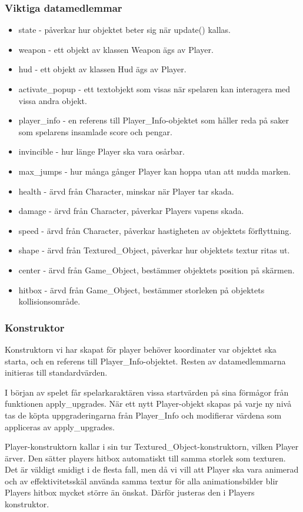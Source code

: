 \documentclass{TDP005mall}
\begin{document}
\subsubsection{Viktiga datamedlemmar}
\begin{itemize}
\item state - påverkar hur objektet beter sig när update() kallas.
\item weapon - ett objekt av klassen Weapon ägs av Player.
\item hud - ett objekt av klassen Hud ägs av Player.
\item activate\_popup - ett textobjekt som visas när spelaren kan interagera med vissa andra objekt.
\item player\_info - en referens till Player\_Info-objektet som håller reda på saker som spelarens insamlade score och pengar.
\item invincible - hur länge Player ska vara osårbar.
\item max\_jumps - hur många gånger Player kan hoppa utan att nudda marken.
\item health - ärvd från Character, minskar när Player tar skada.
\item damage - ärvd från Character, påverkar Players vapens skada.
\item speed - ärvd från Character, påverkar hastigheten av objektets förflyttning.
\item shape - ärvd från Textured\_Object, påverkar hur objektets textur ritas ut.
\item center - ärvd från Game\_Object, bestämmer objektets position på skärmen.
\item hitbox - ärvd från Game\_Object, bestämmer storleken på objektets kollisionsområde.
\end{itemize}

\subsubsection{Konstruktor}
Konstruktorn vi har skapat för player behöver koordinater var objektet ska starta, och en referens till Player\_Info-objektet. Resten av datamedlemmarna initieras till standardvärden.

I början av spelet får spelarkaraktären vissa startvärden på sina förmågor från funktionen apply\_upgrades. När ett nytt Player-objekt skapas på varje ny nivå tas de köpta uppgraderingarna från Player\_Info och modifierar värdena som appliceras av apply\_upgrades. 

Player-konstruktorn kallar i sin tur Textured\_Object-konstruktorn, vilken Player ärver. Den sätter players hitbox automatiskt till samma storlek som texturen. Det är väldigt smidigt i de flesta fall, men då vi vill att Player ska vara animerad och av effektivitetsskäl använda samma textur för alla animationsbilder blir Players hitbox mycket större än önskat. Därför justeras den i Players konstruktor. 
\end{document}
